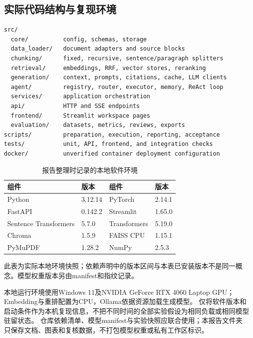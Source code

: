 \documentclass[UTF8,a4paper,zihao=-4,fontset=fandol]{ctexart}
\begin{document}
\subsection{实际代码结构与复现环境}
\begin{lstlisting}
src/
  core/          config, schemas, storage
  data_loader/   document adapters and source blocks
  chunking/      fixed, recursive, sentence/paragraph splitters
  retrieval/     embeddings, RRF, vector stores, reranking
  generation/    context, prompts, citations, cache, LLM clients
  agent/         registry, router, executor, memory, ReAct loop
  services/      application orchestration
  api/           HTTP and SSE endpoints
  frontend/      Streamlit workspace pages
  evaluation/    datasets, metrics, reviews, exports
scripts/         preparation, execution, reporting, acceptance
tests/           unit, API, frontend, and integration checks
docker/          unverified container deployment configuration
\end{lstlisting}
\begin{table}[htbp]\centering
\caption{报告整理时记录的本地软件环境}\label{tab:environment}
\small\setlength{\tabcolsep}{4pt}\renewcommand{\arraystretch}{1.25}
\begin{tabularx}{\linewidth}{@{}XlXl@{}}\toprule
组件 & 版本 & 组件 & 版本 \\ \midrule
Python & 3.12.14 & PyTorch & 2.14.1 \\
FastAPI & 0.142.2 & Streamlit & 1.65.0 \\
Sentence Transformers & 5.7.0 & Transformers & 5.19.0 \\
Chroma & 1.5.9 & FAISS CPU & 1.15.1 \\
PyMuPDF & 1.28.2 & NumPy & 2.5.3 \\
\bottomrule\end{tabularx}
\par\vspace{2pt}\begin{minipage}{\linewidth}\footnotesize 此表为实际本地环境快照；依赖声明中的版本区间与本表已安装版本不是同一概念。模型权重版本另由manifest和指纹记录。\end{minipage}
\end{table}
本地运行环境使用Windows 11及NVIDIA GeForce RTX 4060 Laptop GPU；Embedding与重排配置为CPU，Ollama依据资源加载生成模型。
仅将软件版本和启动条件作为本机复现信息，不把不同时间的全部实验假设为相同负载或相同模型驻留状态。
仓库依赖清单、模型manifest与实验快照应联合使用；本报告文件夹只保存文档、图表和复核数据，不打包模型权重或私有工作区标识。
\end{document}
